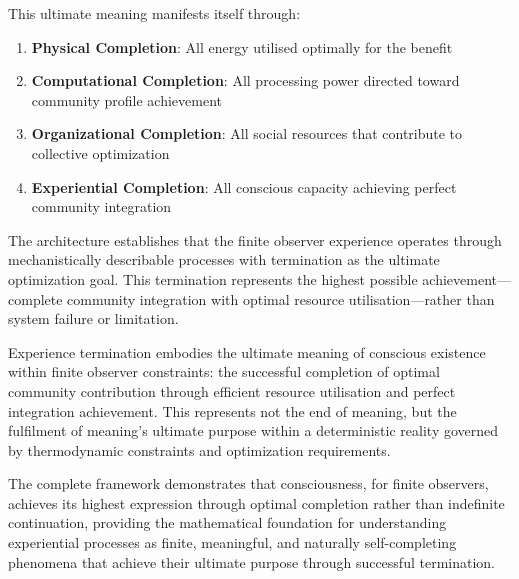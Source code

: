 \documentclass{article}
\begin{document}
This ultimate meaning manifests itself through:

\begin{enumerate}
\item \textbf{Physical Completion}: All energy utilised optimally for the benefit
\item \textbf{Computational Completion}: All processing power directed toward community profile achievement
\item \textbf{Organizational Completion}: All social resources that contribute to collective optimization
\item \textbf{Experiential Completion}: All conscious capacity achieving perfect community integration
\end{enumerate}

The architecture establishes that the finite observer experience operates through mechanistically describable processes with termination as the ultimate optimization goal. This termination represents the highest possible achievement—complete community integration with optimal resource utilisation—rather than system failure or limitation.

Experience termination embodies the ultimate meaning of conscious existence within finite observer constraints: the successful completion of optimal community contribution through efficient resource utilisation and perfect integration achievement. This represents not the end of meaning, but the fulfilment of meaning's ultimate purpose within a deterministic reality governed by thermodynamic constraints and optimization requirements.

The complete framework demonstrates that consciousness, for finite observers, achieves its highest expression through optimal completion rather than indefinite continuation, providing the mathematical foundation for understanding experiential processes as finite, meaningful, and naturally self-completing phenomena that achieve their ultimate purpose through successful termination.
\end{document}
